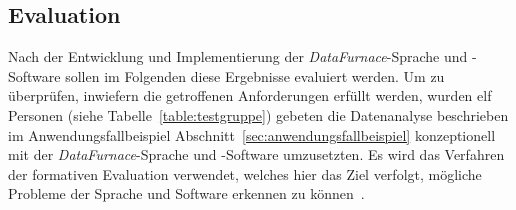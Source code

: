 \documentclass[
  language=german, %
  type=bachelor,%
  ngerman
]{isthesis}
\begin{document}
\begin{content}
%  


\chapter{Evaluation}\label{ch:evaluation}

Nach der Entwicklung und Implementierung der \textit{DataFurnace}-Sprache und
-Software sollen im Folgenden diese Ergebnisse evaluiert werden. Um zu
überprüfen, inwiefern die getroffenen Anforderungen erfüllt werden, wurden elf
Personen (siehe Tabelle~\ref{table:testgruppe}) gebeten die Datenanalyse
beschrieben im Anwendungsfallbeispiel
Abschnitt~\ref{sec:anwendungsfallbeispiel} konzeptionell mit der
\textit{DataFurnace}-Sprache und -Software umzusetzten. Es wird das Verfahren
der formativen Evaluation verwendet, welches hier das Ziel verfolgt, mögliche
Probleme der Sprache und Software erkennen zu können~\cite[][S. 9]{hegner2003methoden}.


\end{content}
\end{document}
